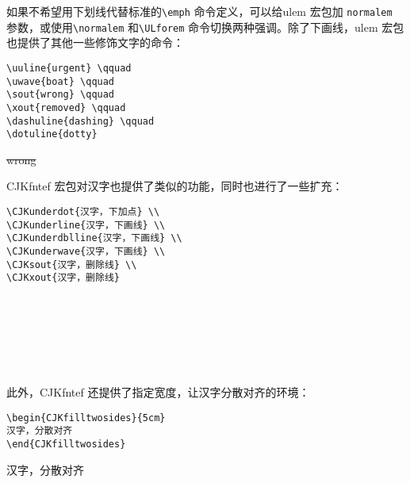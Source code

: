如果不希望用下划线代替标准的\verb|\emph| 命令定义，可以给ulem 宏包加 \verb|normalem| 参数，或使用\verb|\normalem| 和\verb|\ULforem| 命令切换两种强调。除了下画线，ulem 宏包也提供了其他一些修饰文字的命令：

\begin{minipage}[t]{0.45\textwidth}
\begin{lstlisting}
\uuline{urgent} \qquad 
\uwave{boat} \qquad
\sout{wrong} \qquad 
\xout{removed} \qquad
\dashuline{dashing} \qquad 
\dotuline{dotty}
\end{lstlisting}
\end{minipage}
\hfill
\begin{minipage}[t]{0.45\textwidth}
     \qquad {} \qquad
    \sout{wrong} 
    \qquad {} \qquad
     \qquad {}
\end{minipage}

CJKfntef 宏包对汉字也提供了类似的功能，同时也进行了一些扩充：

\begin{minipage}[t]{0.45\textwidth}
\begin{lstlisting}
\CJKunderdot{汉字，下加点} \\
\CJKunderline{汉字，下画线} \\
\CJKunderdblline{汉字，下画线} \\
\CJKunderwave{汉字，下画线} \\
\CJKsout{汉字，删除线} \\
\CJKxout{汉字，删除线}
\end{lstlisting}
\end{minipage}
\hfill
\begin{minipage}[t]{0.45\textwidth}
     \\
     \\
     \\
     \\
     \\
\end{minipage}

此外，CJKfntef 还提供了指定宽度，让汉字分散对齐的环境：

\begin{minipage}[t]{0.45\textwidth}
\begin{lstlisting}
\begin{CJKfilltwosides}{5cm}
汉字，分散对齐
\end{CJKfilltwosides}
\end{lstlisting}
\end{minipage}
\hfill
\begin{minipage}[t]{0.45\textwidth}
    \begin{CJKfilltwosides}{5cm}
        汉字，分散对齐
    \end{CJKfilltwosides}
\end{minipage}

